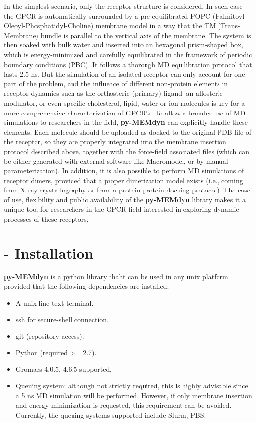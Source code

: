 \documentclass[10pt, oneside, pdftex]{article}
\begin{document}
In   the   simplest  scenario,   only   the   receptor  structure   is
considered. In  such case  the GPCR is  automatically surrounded  by a
pre-equilibrated POPC (Palmitoyl-Oleoyl-Phosphatidyl-Choline) membrane
model in a way that the  TM (Trans-Membrane) bundle is parallel to the
vertical axis  of the  membrane. The system  is then soaked  with bulk
water  and  inserted  into  an hexagonal prism-shaped  box,  which  is
energy-minimized  and  carefully  equilibrated  in  the  framework  of
periodic  boundary  conditions  (PBC).    It  follows  a  thorough  MD
equilibration protocol  that lasts 2.5  ns.  But the simulation  of an
isolated receptor  can only account for  one part of  the problem, and
the influence  of different non-protein elements  in receptor dynamics
such  as the  orthosteric (primary)  ligand, an  allosteric  modulator, or  even
specific cholesterol, lipid, water or  ion molecules is key for a more
comprehensive characterization  of GPCR's.  To allow a  broader use of
MD  simulations to  researchers in  the field,  \textbf{py-MEMdyn} can
explicitly handle these elements.  Each molecule should be uploaded as
docked to the original PDB file  of the receptor, so they are properly
integrated  into  the  membrane  insertion protocol  described  above,
together with  the force-field associated  files (which can  be either
generated  with external  software like  Macromodel, or  by manual
parameterization).   In addition, it  is also  possible to  perform MD
simulations of  receptor dimers,  provided that a  proper dimerization
model  exists (i.e., coming  from  X-ray  crystallography  or from  a
protein-protein docking  protocol).  The  ease of use,  flexibility and
public  availability  of the  \textbf{py-MEMdyn}  library  makes it  a
unique tool for researchers in  the GPCR field interested in exploring
dynamic processes of these receptors.

\section*{ - Installation}
\textbf{py-MEMdyn} is a python library thaht can be used in  any unix
platform provided that the following dependencies are installed:
\begin{itemize}\itemsep0em
\item {A unix-line text terminal.}
\item {ssh for secure-shell connection.}
\item {git (repository access).}
\item {Python (required >= 2.7).}
\item {Gromacs 4.0.5, 4.6.5 supported.}
\item {Queuing system: although  not strictly required, this is highly
  advisable since a 5 ns  MD simulation will be performed. However, if
  only membrane  insertion and energy minimization  is requested, this
  requirement can be avoided. Currently, the queuing systems supported
  include Slurm, PBS.}
\end{itemize}
\end{document}
